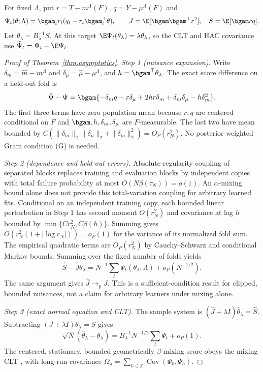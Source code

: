 For fixed $\Lambda$, put $r=T-m^\Lambda(F)$, $q=Y-\mu^\Lambda(F)$ and
\[
\Psi_t(\theta;\Lambda)=\bgam_t r_t(q_t-r_t\bgam_t^\top\theta),\qquad
J=\E[\bgam\bgam^\top r^2],\quad S=\E[\bgam rq].
\]
Let $\theta_\lambda=B_\lambda^{-1}S$. At this target $\E\Psi_t(\theta_\lambda)=\lambda\theta_\lambda$, so the CLT and HAC covariance use $\widetilde\Psi_t=\Psi_t-\E\Psi_t$.

\begin{proof}[Proof of Theorem~\ref{thm:asymptotics}]
\emph{Step 1 (nuisance expansion).} Write $\delta_m=\hat m-m^\Lambda$ and $\delta_\mu=\hat\mu-\mu^\Lambda$, and $h=\bgam^\top\theta_\lambda$. The exact score difference on a held-out fold is
\[
\hat\Psi-\Psi
=\bgam\{-\delta_m q-r\delta_\mu+2hr\delta_m
 +\delta_m\delta_\mu-h\delta_m^2\}.
\]
The first three terms have zero population mean because $r,q$ are centered conditional on $F$ and $\bgam,h,\delta_m,\delta_\mu$ are $F$-measurable. The last two have mean bounded by $C(\|\delta_m\|_2\|\delta_\mu\|_2+\|\delta_m\|_2^2)=O_P(r_N^2)$. No posterior-weighted Gram condition (G) is needed.

\emph{Step 2 (dependence and held-out errors).} Absolute-regularity coupling of separated blocks \citep{yu1994rates} replaces training and evaluation blocks by independent copies with total failure probability at most $O(N\beta(\tau_N))=o(1)$. An $\alpha$-mixing bound alone does not provide this total-variation coupling for arbitrary learned fits. Conditional on an independent training copy, each bounded linear perturbation in Step 1 has second moment $O(r_N^2)$ and covariance at lag $h$ bounded by $\min\{Cr_N^2,C\beta(h)\}$. Summing gives $O(r_N^2(1+|\log r_N|))=o_P(1)$ for the variance of its normalized fold sum. The empirical quadratic terms are $O_P(r_N^2)$ by Cauchy--Schwarz and conditional Markov bounds. Summing over the fixed number of folds yields
\[
\hat S-\hat J\theta_\lambda
=N^{-1}\sum_t\Psi_t(\theta_\lambda;\Lambda)+o_P(N^{-1/2}).
\]
The same argument gives $\hat J\to_p J$. This is a sufficient-condition result for clipped, bounded nuisances, not a claim for arbitrary learners under mixing alone.

\emph{Step 3 (exact normal equation and CLT).} The sample system is $(\hat J+\lambda I)\hat\theta_\lambda=\hat S$. Subtracting $(J+\lambda I)\theta_\lambda=S$ gives
\[
\sqrt N(\hat\theta_\lambda-\theta_\lambda)
=B_\lambda^{-1}N^{-1/2}\sum_t\widetilde\Psi_t+o_P(1).
\]
The centered, stationary, bounded geometrically $\beta$-mixing score obeys the mixing CLT \citep{ibragimov1962some}, with long-run covariance $\Omega_\lambda=\sum_{h\in\mathbb Z}\operatorname{Cov}(\Psi_0,\Psi_h)$.


\end{proof}
